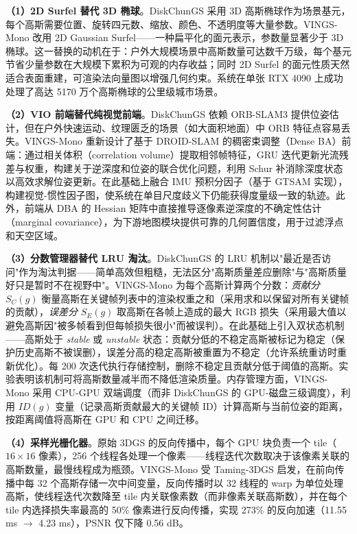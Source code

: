 \textbf{（1）2D Surfel 替代 3D 椭球}。DiskChunGS 采用 3D 高斯椭球作为场景基元，每个高斯需要位置、旋转四元数、缩放、颜色、不透明度等大量参数。VINGS-Mono 改用 2D Gaussian Surfel——一种扁平化的面元表示，参数量显著少于 3D 椭球。这一替换的动机在于：户外大规模场景中高斯数量可达数千万级，每个基元节省少量参数在大规模下累积为可观的内存收益；同时 2D Surfel 的面元性质天然适合表面重建，可渲染法向量图以增强几何约束。系统在单张 RTX 4090 上成功处理了高达 5170 万个高斯椭球的公里级城市场景。

\textbf{（2）VIO 前端替代纯视觉前端}。DiskChunGS 依赖 ORB-SLAM3 提供位姿估计，但在户外快速运动、纹理匮乏的场景（如大面积地面）中 ORB 特征点容易丢失。VINGS-Mono 重新设计了基于 DROID-SLAM 的稠密束调整（Dense BA）前端：通过相关体积（correlation volume）提取相邻帧特征，GRU 迭代更新光流残差与权重，构建关于逆深度和位姿的联合优化问题，利用 Schur 补消除深度状态以高效求解位姿更新。在此基础上融合 IMU 预积分因子（基于 GTSAM 实现），构建视觉-惯性因子图，使系统在单目尺度歧义下仍能获得度量级一致的轨迹。此外，前端从 DBA 的 Hessian 矩阵中直接推导逐像素逆深度的不确定性估计（marginal covariance），为下游地图模块提供可靠的几何置信度，用于过滤浮点和天空区域。

\textbf{（3）分数管理器替代 LRU 淘汰}。DiskChunGS 的 LRU 机制以"最近是否访问"作为淘汰判据——简单高效但粗糙，无法区分"高斯质量差应删除"与"高斯质量好只是暂时不在视野中"。VINGS-Mono 为每个高斯计算两个分数：\textit{贡献分} $S_C(g)$ 衡量高斯在关键帧列表中的渲染权重之和（采用求和以保留对所有关键帧的贡献），\textit{误差分} $S_E(g)$ 取高斯在各帧上造成的最大 RGB 损失（采用最大值以避免高斯因"被多帧看到但每帧损失很小"而被误判）。在此基础上引入双状态机制——高斯处于 \textit{stable} 或 \textit{unstable} 状态：贡献分低的不稳定高斯被标记为稳定（保护历史高斯不被误删），误差分高的稳定高斯被重置为不稳定（允许系统重访时重新优化）。每 200 次迭代执行存储控制，删除不稳定且贡献分低于阈值的高斯。实验表明该机制可将高斯数量减半而不降低渲染质量。内存管理方面，VINGS-Mono 采用 CPU-GPU 双端调度（而非 DiskChunGS 的 GPU-磁盘三级调度），利用 $ID(g)$ 变量（记录高斯贡献最大的关键帧 ID）计算高斯与当前位姿的距离，按距离阈值将高斯在 GPU 和 CPU 之间迁移。

\textbf{（4）采样光栅化器}。原始 3DGS 的反向传播中，每个 GPU 块负责一个 tile（$16\times16$ 像素），256 个线程各处理一个像素——线程迭代次数取决于该像素关联的高斯数量，最慢线程成为瓶颈。VINGS-Mono 受 Taming-3DGS 启发，在前向传播中每 32 个高斯存储一次中间变量，反向传播时以 32 线程的 warp 为单位处理高斯，使线程迭代次数降至 tile 内关联像素数（而非像素关联高斯数），并在每个 tile 内选择损失率最高的 50\% 像素进行反向传播，实现 273\% 的反向加速（11.55 ms $\to$ 4.23 ms），PSNR 仅下降 0.56 dB。

